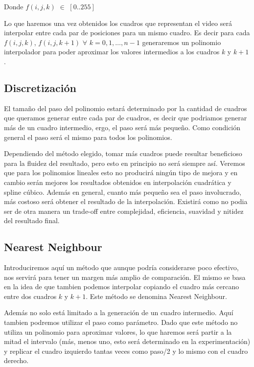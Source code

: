\vspace{4mm}

Donde $f(i, j, k)$ $\in$ $[0..255]$

Lo que haremos una vez obtenidos los cuadros que representan el video será interpolar entre cada par de posiciones para un mismo cuadro. Es decir para cada $f(i, j, k)$, $f(i, j, k+1)$ $\forall$ $k = 0, 1, \dots, n-1$ generaremos un polinomio interpolador para poder aproximar los valores intermedios a los cuadros $k$ y $k+1$.

\subsection{Discretización}

El tamaño del paso del polinomio estará determinado por la cantidad de cuadros que queramos generar entre cada par de cuadros, es decir que podriamos generar más de un cuadro intermedio, ergo, el paso será más pequeño. Como condición general el paso será el mismo para todos los polinomios. 

Dependiendo del método elegido, tomar más cuadros puede resultar beneficioso para la fluidez del resultado, pero esto en principio no será siempre así. Veremos que para los polinomios lineales esto no producirá ningún tipo de mejora y en cambio serán mejores los resultados obtenidos en interpolación cuadrática y spline cúbico. Además en general, cuanto más pequeño sea el paso involucrado, más costoso será obtener el resultado de la interpolación. Existirá como no podia ser de otra manera un trade-off entre complejidad, eficiencia, suavidad y nitidez del resultado final. 

\subsection{Nearest Neighbour}

Introduciremos aquí un método que aunque podría considerarse poco efectivo, nos servirá para tener un margen más amplio de comparación. El mismo se basa en la idea de que tambien podemos interpolar copiando el cuadro más cercano entre dos cuadros $k$ y $k+1$. Este método se denomina Nearest Neighbour. 

Además no solo está limitado a la generación de un cuadro intermedio. Aquí tambien podremos utilizar el paso como parámetro. Dado que este método no utiliza un polinomio para aproximar valores, lo que haremos será partir a la mitad el intervalo (más, menos uno, esto será determinado en la experimentación) y replicar el cuadro izquierdo tantas veces como paso/2 y lo mismo con el cuadro derecho. 

